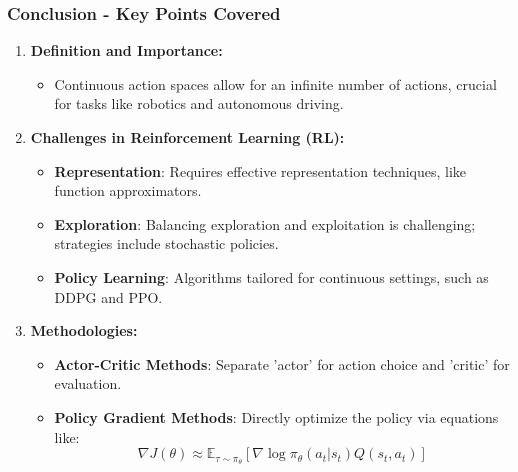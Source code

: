 \documentclass[aspectratio=169]{beamer}
\begin{document}
\begin{frame}[fragile]
    \frametitle{Conclusion - Key Points Covered}
    \begin{enumerate}
        \item \textbf{Definition and Importance:}
        \begin{itemize}
            \item Continuous action spaces allow for an infinite number of actions, crucial for tasks like robotics and autonomous driving.
        \end{itemize}

        \item \textbf{Challenges in Reinforcement Learning (RL):}
        \begin{itemize}
            \item \textbf{Representation}: Requires effective representation techniques, like function approximators.
            \item \textbf{Exploration}: Balancing exploration and exploitation is challenging; strategies include stochastic policies.
            \item \textbf{Policy Learning}: Algorithms tailored for continuous settings, such as DDPG and PPO.
        \end{itemize}

        \item \textbf{Methodologies:}
        \begin{itemize}
            \item \textbf{Actor-Critic Methods}: Separate 'actor' for action choice and 'critic' for evaluation.
            \item \textbf{Policy Gradient Methods}: Directly optimize the policy via equations like:
            \[
            \nabla J(\theta) \approx \mathbb{E}_{\tau \sim \pi_\theta} \left[ \nabla \log \pi_\theta(a_t | s_t) Q(s_t, a_t) \right]
            \]
        \end{itemize}
    \end{enumerate}
\end{frame}
\end{document}
